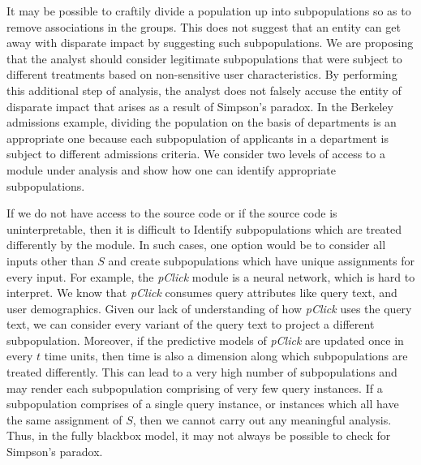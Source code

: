 \documentclass[10pt, onecolumn]{report}
\begin{document}
It may be possible to craftily divide a population up into subpopulations
so as to remove associations in the groups. This does not suggest that an entity can get
away with disparate impact by suggesting such subpopulations.
We are proposing that the analyst should consider legitimate subpopulations 
that were subject to different treatments based on non-sensitive user 
characteristics. By performing this additional step of analysis, the analyst 
does not falsely accuse the entity of disparate impact that arises as a result
of Simpson's paradox. In the Berkeley admissions example, dividing the population on 
the basis of departments is an appropriate one because each subpopulation of 
applicants in a department is subject to different admissions criteria.
We consider two levels of access to a module under analysis and show how
one can identify appropriate subpopulations. 

If we do not have access to the source code or if the source code is uninterpretable, then
it is difficult to Identify subpopulations which are treated differently by the module.
In such cases, one option would be to consider all inputs other than $S$
and create subpopulations which have unique assignments for every input. 
For example, the \emph{pClick} module is a neural network, which is hard to 
interpret. We know that \emph{pClick} consumes query attributes like query text, 
and user demographics. Given our lack of understanding of how \emph{pClick} uses 
the query text, we can consider every variant of the query text to project a different
subpopulation. %
Moreover, if the predictive models of \emph{pClick} are
updated once in every $t$ time units, then time is also a dimension along
which subpopulations are treated differently. 
This can lead to a very high number of subpopulations
and may render each subpopulation comprising of very few query instances. 
If a subpopulation comprises of a single query instance, or instances which all have the 
same assignment of $S$, then we cannot carry out any meaningful
analysis. Thus, in the fully blackbox model, it may not always be possible to
check for Simpson's paradox. 
\end{document}
